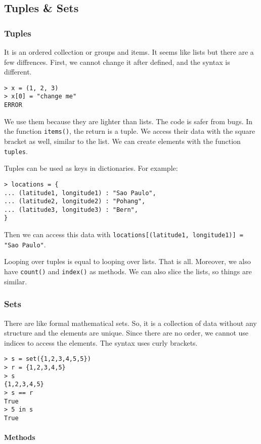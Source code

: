 \subsection{Tuples \& Sets}

\subsubsection{Tuples}

It is an ordered collection or groups and items. It seems like lists but there are a few diffrences. First, we cannot change it after defined, and the syntax is different.
\begin{verbatim}
> x = (1, 2, 3)	
> x[0] = "change me"
ERROR
\end{verbatim}
We use them because they are lighter than lists. The code is safer from bugs. In the function \verb|items()|, the return is a tuple. We access their data with the square bracket as well, similar to the list. We can create elements with the function \verb|tuples|.

Tuples can be used as keys in dictionaries. For example:
\begin{verbatim}
> locations = { 
... (latitude1, longitude1) : "Sao Paulo",
... (latitude2, longitude2) : "Pohang",
... (latitude3, longitude3) : "Bern",
}
\end{verbatim}
Then we can access this data with \verb|locations[(latitude1, longitude1)] = "Sao Paulo"|. 

Looping over tuples is equal to looping over lists. That is all. Moreover, we also have \verb|count()| and \verb|index()| as methods. We can also slice the lists, so things are similar. 


\subsubsection{Sets}

There are like formal mathematical sets. So, it is a collection of data without any structure and the elements are unique. Since there are no order, we cannot use indices to access the elements. The syntax uses curly brackets. 
\begin{verbatim}
> s = set({1,2,3,4,5,5})
> r = {1,2,3,4,5}	
> s
{1,2,3,4,5}
> s == r
True
> 5 in s
True
\end{verbatim}

\paragraph{Methods}

